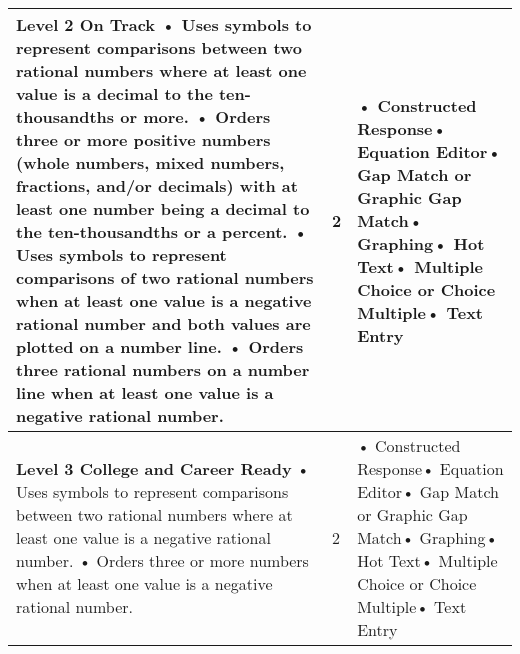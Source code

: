 \documentclass[11pt, English]{article}
\begin{document}
\begin{longtable}{|p{11.0cm}|p{1.8cm}|p{3.7cm}|}
\textbf{Level 2 On Track}\newline
• Uses symbols to represent comparisons between two rational numbers where at least one value is a decimal to the ten-thousandths or more. \newline• Orders three or more positive numbers (whole numbers, mixed numbers, fractions, and/or decimals) with at least one number being a decimal to the ten-thousandths or a percent. \newline• Uses symbols to represent comparisons of two rational numbers when at least one value is a negative rational number and both values are plotted on a number line. \newline• Orders three rational numbers on a number line when at least one value is a negative rational number. \newline

 & \hfil{2}
 &• Constructed Response\newline• Equation Editor\newline• Gap Match or Graphic Gap Match\newline• Graphing\newline• Hot Text\newline• Multiple Choice or Choice Multiple\newline• Text Entry\\
\hline


 
\textbf{Level 3 College and Career Ready}\newline
• Uses symbols to represent comparisons between two rational numbers where at least one value is a negative rational number. \newline• Orders three or more numbers when at least one value is a negative rational number. \newline

& \hfil{2}
&• Constructed Response\newline• Equation Editor\newline• Gap Match or Graphic Gap Match\newline• Graphing\newline• Hot Text\newline• Multiple Choice or Choice Multiple\newline• Text Entry\\
\hline 


\end{longtable}
\end{document}
